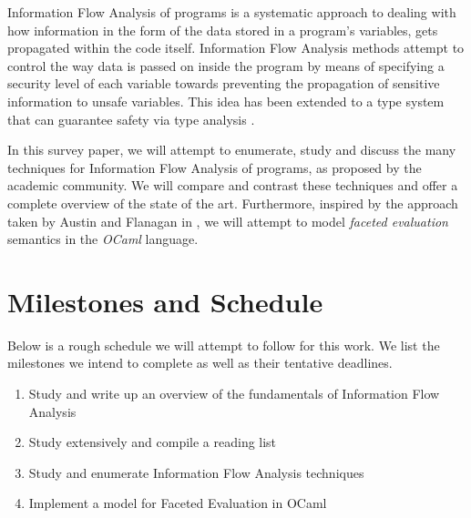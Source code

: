 \documentclass[11pt,letterpaper]{article}
\newcommand{\tab}[1]{\hspace{.08\textwidth}\rlap{#1}}
\begin{document}
Information Flow Analysis \cite{denning_lattice_1976} of programs is a systematic approach to dealing with how information in the form of the data stored in a program's variables, gets propagated within the code itself. Information Flow Analysis methods attempt to control the way data is passed on inside the program by means of specifying a security level of each variable towards preventing the propagation of sensitive information to unsafe variables. This idea has been extended to a type system that can guarantee safety via type analysis \cite{smith_sound_1996}.

In this survey paper, we will attempt to enumerate, study and discuss the many techniques for Information Flow Analysis of programs, as proposed by the academic community. We will compare and contrast these techniques and offer a complete overview of the state of the art. Furthermore, inspired by the approach taken by Austin and Flanagan in \cite{austin_multiple_2012}, we will attempt to model  \textit{faceted evaluation} semantics in the \textit{OCaml} language.

\section*{Milestones and Schedule}
Below is a rough schedule we will attempt to follow for this work. We list the milestones we intend to complete as well as their tentative deadlines.

\begin{enumerate}
  \item Study and write up an overview of the fundamentals of Information Flow Analysis \tab{by \textit{11/14}}
  \item Study \cite{austin_multiple_2012} extensively and compile a reading list \tab{by \textit{11/21}}
  \item Study and enumerate Information Flow Analysis techniques \tab{by \textit{11/28}}
  \item Implement a model for Faceted Evaluation in OCaml \tab{by \textit{12/5}}
\end{enumerate}



\end{document}
